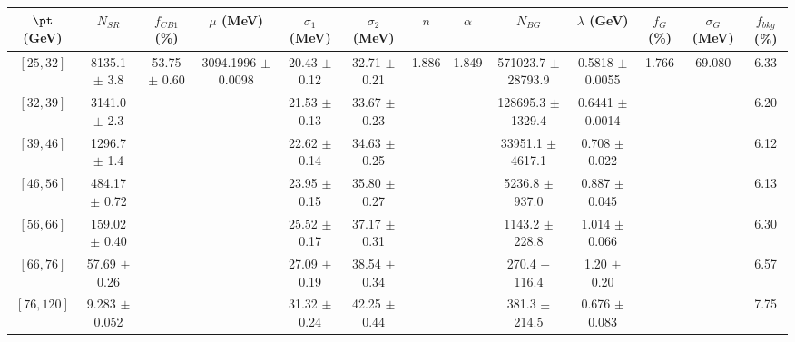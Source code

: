 \begin{tabular}{c||c|c|c|c|c|c|c|c|c|c|c||c}
$\pt$ (GeV) & $N_{SR}$ & $f_{CB1}$ (\%) & $\mu$ (MeV) & $\sigma_1$ (MeV) & $\sigma_2$ (MeV) & $n$ & $\alpha$ & $N_{BG}$ & $\lambda$ (GeV) & $f_G$ (\%) & $\sigma_G$ (MeV) & $f_{bkg}$ (\%) \\
\hline
$[25, 32]$ & 8135.1 $\pm$ 3.8 & \multirow{7}{*}{53.75 $\pm$ 0.60} & \multirow{7}{*}{3094.1996 $\pm$ 0.0098} & 20.43 $\pm$ 0.12 & 32.71 $\pm$ 0.21 & \multirow{7}{*}{1.886} & \multirow{7}{*}{1.849} & 571023.7 $\pm$ 28793.9 & 0.5818 $\pm$ 0.0055 & \multirow{7}{*}{1.766} & \multirow{7}{*}{69.080} & 6.33\\
$[32, 39]$ & 3141.0 $\pm$ 2.3 &  &  & 21.53 $\pm$ 0.13 & 33.67 $\pm$ 0.23 &  &  & 128695.3 $\pm$ 1329.4 & 0.6441 $\pm$ 0.0014 &  &  & 6.20\\
$[39, 46]$ & 1296.7 $\pm$ 1.4 &  &  & 22.62 $\pm$ 0.14 & 34.63 $\pm$ 0.25 &  &  & 33951.1 $\pm$ 4617.1 & 0.708 $\pm$ 0.022 &  &  & 6.12\\
$[46, 56]$ & 484.17 $\pm$ 0.72 &  &  & 23.95 $\pm$ 0.15 & 35.80 $\pm$ 0.27 &  &  & 5236.8 $\pm$ 937.0 & 0.887 $\pm$ 0.045 &  &  & 6.13\\
$[56, 66]$ & 159.02 $\pm$ 0.40 &  &  & 25.52 $\pm$ 0.17 & 37.17 $\pm$ 0.31 &  &  & 1143.2 $\pm$ 228.8 & 1.014 $\pm$ 0.066 &  &  & 6.30\\
$[66, 76]$ & 57.69 $\pm$ 0.26 &  &  & 27.09 $\pm$ 0.19 & 38.54 $\pm$ 0.34 &  &  & 270.4 $\pm$ 116.4 & 1.20 $\pm$ 0.20 &  &  & 6.57\\
$[76, 120]$ & 9.283 $\pm$ 0.052 &  &  & 31.32 $\pm$ 0.24 & 42.25 $\pm$ 0.44 &  &  & 381.3 $\pm$ 214.5 & 0.676 $\pm$ 0.083 &  &  & 7.75\\
\end{tabular}
